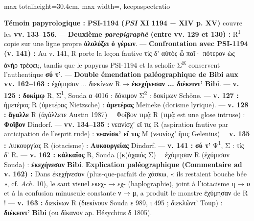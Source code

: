 \documentclass[11pt,twoside]{book}
\newcommand{\currHeadLE}{ΑΡΙΣΤΟΦΑΝΟΥΣ ΘΕΣΜΟΦΟΡΙΑΖΟΥΣΑΙ · SCHOLIES ({\policeGr Σ}\expo{R}) \& GLOSES DU CODEX RAVENNAS 429}
\newcommand{\currHeadRE}{Atlas \& Édition Folio par Folio (ff. 162v–177r)}
\newcommand{\currHeadLO}{ATLAS DES SCHOLIES ({\policeGr Σ}\expo{R}), GLOSES INTERLINÉAIRES \& COLLATION DE R}
\newcommand{\currHeadRO}{Édition Louis Hauseux (Bibi)}
\newcommand{\italique}[1]{\textit{#1}}
\newcommand{\expo}[1]{\textsuperscript{#1}}
\newcommand{\Run}{R\expo{1}}
\newcommand{\Mon}{M}
\newcommand{\PsiUn}{PSI-1194}
\newcommand{\lecon}[1]{\textbf{#1}}
\newcommand{\espApp}{\ {\color{ruleGold}{\policeFr ∥}}\ }
\begin{document}
\begin{adjustbox}{max totalheight=30.4cm, max width=\textwidth, keepaspectratio}
\begin{minipage}{\textwidth}
{ \textbf{Témoin papyrologique :} \textbf{\PsiUn{} (\italique{PSI} XI 1194 + XIV p. XV)} couvre les \textbf{vv. 133–156}. --- \textbf{Deuxième \italique{parepigraphè} (entre vv. 129 et 130) :} \Run{} copie sur une ligne propre \lecon{ὀλολύζει ὁ γέρων}. --- \textbf{Confrontation avec \PsiUn{} (v. 141) :} Au v. 141, R porte la leçon fautive τίς δ' αὐτὸς ὦ παῖ· πότερον ὡς ἀνὴρ τρέφει;, tandis que le papyrus \PsiUn{} et la scholie {\policeGr Σ}\expo{R} conservent l'authentique \lecon{σύ τ'}. --- \textbf{Double émendation paléographique de \textbf{Bibi} aux vv. 162–163 :} ἐχύμησαν ... διεκίνων R {\policeFr →} \lecon{ἐκεχήνεσαν ... διέκειντ'} \textbf{Bibi}. --- \textbf{v. 125 :} \lecon{δοκίμῳ} R, {\policeGr Σ}\expo{1}, Souda α 4016 : δόκιμον {\policeGr Σ}\expo{2} : δοκίμων Schöne. --- \textbf{v. 127 :} ἡμετέρας R (ὑμετέρας Nietzsche) : \lecon{ἁμετέρας} Meineke (dorisme lyrique). --- \textbf{v. 128 :} \lecon{ἄγαλλε} R (ἀγάλλετε Austin 1987) \espApp Φοῖβον τιμᾷ R (τιμᾷ est une glose intruse) : \lecon{Φοῖβον} Dindorf. --- \textbf{vv. 134–135 :} νεανίσχ' εἴ τις R (aspiration fautive par anticipation de l'esprit rude) : \lecon{νεανίσκ' εἴ τις} \Mon{} (νεανίσχ' ἥτις Gelenius) \espApp \textbf{v. 135 :} Λυκουργίας R (iotacisme) : \lecon{Λυκουργείας} Dindorf. --- \textbf{v. 141 :} \lecon{σύ τ'} {\policeGr Ψ}\expo{1}, {\policeGr Σ} : τίς δ' R. --- \textbf{v. 162 :} \lecon{κἀλκαῖος} R, Souda ((κ)ἀχαιός {\policeGr Σ}) \espApp ἐχύμησαν R (ἐχύμισαν Souda) : \lecon{ἐκεχήνεσαν} \lecon{Bibi}. \textbf{Explication paléographique (Commentaire ad v. 162) :} Dans ἐκεχήνεσαν (plus-que-parfait de χάσκω, « ils restaient bouche bée », cf. \italique{Ach.} 10), le saut visuel εκεχ- {\policeFr →} εχ- (haplographie), joint à l'iotacisme η → υ et à la confusion minuscule constante ν → μ, a produit le monstre ἐχύμησαν de R ! --- \textbf{v. 163 :} διεκίνων R (διεκίνουν Souda ε 989, ι 495 ; διεκλῶντ' Toup) : \lecon{διέκειντ'} \lecon{Bibi} (ou δίκανον ap. Hésychius δ 1805).\par}
\end{minipage}\end{adjustbox}
\newpage
\renewcommand{\currHeadLE}{SCHOLIES MARGINALES ({\policeGr Σ}\expo{R}) \& GLOSES INTERLINÉAIRES · FOLIO 04/30}
\renewcommand{\currHeadRE}{f. 164r (Classense 166r) · vv. 123–164 · {\policeGr Σ} 052 à {\policeGr Σ} 073}
\renewcommand{\currHeadLO}{SCHOLIES MARGINALES ({\policeGr Σ}\expo{R}) \& GLOSES INTERLINÉAIRES · FOLIO 04/30}
\renewcommand{\currHeadRO}{f. 164r (Classense 166r) · vv. 123–164 · {\policeGr Σ} 052 à {\policeGr Σ} 073}
\end{document}
